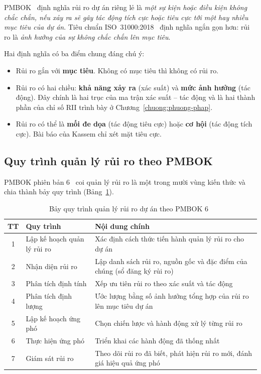 PMBOK~\cite{pmbok6} định nghĩa rủi ro dự án riêng lẻ là \emph{một sự kiện hoặc điều kiện không chắc chắn, nếu xảy ra sẽ gây tác động tích cực hoặc tiêu cực tới một hay nhiều mục tiêu của dự án}. Tiêu chuẩn ISO~31000:2018~\cite{iso31000} định nghĩa ngắn gọn hơn: rủi ro là \emph{ảnh hưởng của sự không chắc chắn lên mục tiêu}.

Hai định nghĩa có ba điểm chung đáng chú ý:
\begin{itemize}
  \item Rủi ro gắn với \textbf{mục tiêu}. Không có mục tiêu thì không có rủi ro.
  \item Rủi ro có hai chiều: \textbf{khả năng xảy ra} (xác suất) và \textbf{mức ảnh hưởng} (tác động). Đây chính là hai trục của ma trận xác suất -- tác động và là hai thành phần của chỉ số RII trình bày ở Chương~\ref{chuong:phuong-phap}.
  \item Rủi ro có thể là \textbf{mối đe dọa} (tác động tiêu cực) hoặc \textbf{cơ hội} (tác động tích cực). Bài báo của Kassem chỉ xét mặt tiêu cực.
\end{itemize}

\subsection{Quy trình quản lý rủi ro theo PMBOK}

PMBOK phiên bản 6~\cite{pmbok6} coi quản lý rủi ro là một trong mười vùng kiến thức và chia thành bảy quy trình (Bảng~\ref{tab:quy-trinh-pmbok}).

\begin{table}[H]
\centering
\caption{Bảy quy trình quản lý rủi ro dự án theo PMBOK 6~\cite{pmbok6}}
\label{tab:quy-trinh-pmbok}
\begin{tabularx}{\textwidth}{@{}clX@{}}
\toprule
\textbf{TT} & \textbf{Quy trình} & \textbf{Nội dung chính} \\
\midrule
1 & Lập kế hoạch quản lý rủi ro & Xác định cách thức tiến hành quản lý rủi ro cho dự án \\
2 & Nhận diện rủi ro & Lập danh sách rủi ro, nguồn gốc và đặc điểm của chúng (sổ đăng ký rủi ro) \\
3 & Phân tích định tính & Xếp ưu tiên rủi ro theo xác suất và tác động \\
4 & Phân tích định lượng & Ước lượng bằng số ảnh hưởng tổng hợp của rủi ro lên mục tiêu dự án \\
5 & Lập kế hoạch ứng phó & Chọn chiến lược và hành động xử lý từng rủi ro \\
6 & Thực hiện ứng phó & Triển khai các hành động đã thống nhất \\
7 & Giám sát rủi ro & Theo dõi rủi ro đã biết, phát hiện rủi ro mới, đánh giá hiệu quả ứng phó \\
\bottomrule
\end{tabularx}
\end{table}

